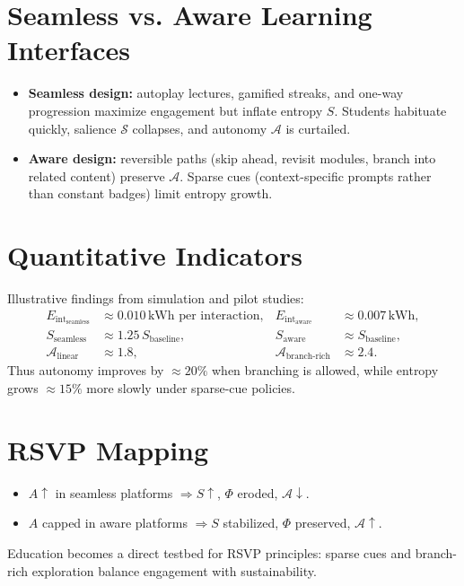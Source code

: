 \documentclass[openany]{book}
\newcommand{\Eint}{E_{\mathrm{int}}} %
\newcommand{\Auton}{\mathcal{A}} %
\begin{document}
\section{Seamless vs. Aware Learning Interfaces}
\label{sec:edu-seamless}
\begin{itemize}
  \item \textbf{Seamless design:} autoplay lectures, gamified streaks, and one-way progression maximize engagement but inflate entropy $S$. Students habituate quickly, salience $\mathcal{S}$ collapses, and autonomy $\Auton$ is curtailed.
  \item \textbf{Aware design:} reversible paths (skip ahead, revisit modules, branch into related content) preserve $\Auton$. Sparse cues (context-specific prompts rather than constant badges) limit entropy growth.
\end{itemize}

\section{Quantitative Indicators}
\label{sec:edu-indicators}
Illustrative findings from simulation and pilot studies:
\begin{align}
\Eint_{\text{seamless}} &\approx 0.010 \,\text{kWh per interaction}, &
\Eint_{\text{aware}} &\approx 0.007 \,\text{kWh}, \\
S_{\text{seamless}} &\approx 1.25\, S_{\text{baseline}}, &
S_{\text{aware}} &\approx S_{\text{baseline}}, \\
\Auton_{\text{linear}} &\approx 1.8, &
\Auton_{\text{branch-rich}} &\approx 2.4.
\end{align}
Thus autonomy improves by $\approx 20\%$ when branching is allowed, while entropy grows $\approx 15\%$ more slowly under sparse-cue policies.

\section{RSVP Mapping}
\label{sec:edu-rsvp}
\begin{itemize}
  \item $A \uparrow$ in seamless platforms $\Rightarrow S \uparrow$, $\Phi$ eroded, $\Auton \downarrow$.
  \item $A$ capped in aware platforms $\Rightarrow S$ stabilized, $\Phi$ preserved, $\Auton \uparrow$.
\end{itemize}
Education becomes a direct testbed for RSVP principles: sparse cues and branch-rich exploration balance engagement with sustainability.
\end{document}
